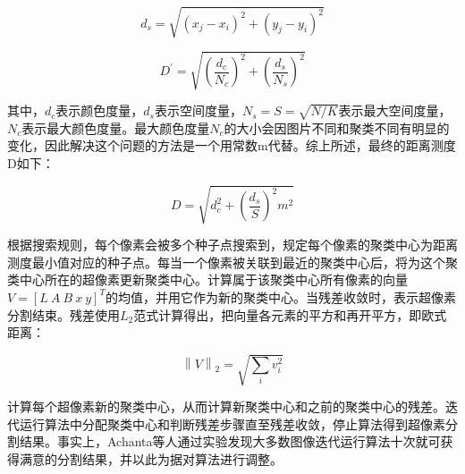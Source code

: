 \documentclass[nomlist,masters]{seuthesix}
\begin{document}
\begin{equation}
d_{s}=\sqrt{(x_{j}-x_{i})^{2}+(y_{j}-y_{i})^{2}}
\label{SLICds}
\end{equation}

\begin{equation}
D^{'}=\sqrt{(\frac{d_{c}}{N_{c}})^{2}+(\frac{d_{s}}{N_{s}})^{2}}
\label{SLICd}
\end{equation}

其中，$d_{c}$表示颜色度量，$d_{s}$表示空间度量，$N_{s}=S=\sqrt{N/K}$表示最大空间度量，$N_{c}$表示最大颜色度量。最大颜色度量$N_{c}$的大小会因图片不同和聚类不同有明显的变化，因此解决这个问题的方法是一个用常数m代替。综上所述，最终的距离测度D如下：

\begin{equation}
D=\sqrt{d_{c}^{2}+(\frac{d_{s}}{S})^{2}m^{2}}
\label{SLICD}
\end{equation}

根据搜索规则，每个像素会被多个种子点搜索到，规定每个像素的聚类中心为距离测度最小值对应的种子点。每当一个像素被关联到最近的聚类中心后，将为这个聚类中心所在的超像素更新聚类中心。计算属于该聚类中心所有像素的向量$V =\left [ L\ A\ B\ x \ y \right ]^{T} $的均值，并用它作为新的聚类中心。当残差收敛时，表示超像素分割结束。残差使用$L_{2}$范式计算得出，把向量各元素的平方和再开平方，即欧式距离：

\begin{equation}
\left \| V \right \|_{2}=\sqrt{\sum_{i}v_{i}^{2}}
\label{SLICerror}
\end{equation}

计算每个超像素新的聚类中心，从而计算新聚类中心和之前的聚类中心的残差。迭代运行算法中分配聚类中心和判断残差步骤直至残差收敛，停止算法得到超像素分割结果。事实上，Achanta等人通过实验发现大多数图像迭代运行算法十次就可获得满意的分割结果，并以此为据对算法进行调整。
\end{document}

